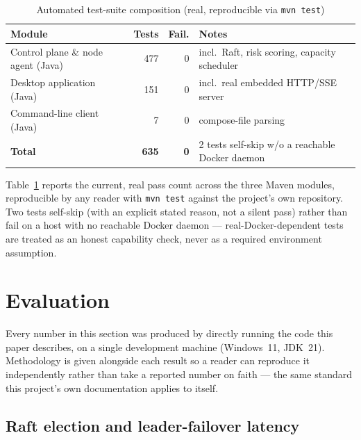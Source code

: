 \documentclass[conference]{IEEEtran}
\begin{document}
\begin{table}[t]
\caption{Automated test-suite composition (real, reproducible via \texttt{mvn test})}
\label{tab:tests}
\centering
\small
\begin{tabularx}{\linewidth}{@{}X r r X@{}}
\toprule
\textbf{Module} & \textbf{Tests} & \textbf{Fail.} & \textbf{Notes} \\
\midrule
Control plane \& node agent (Java) & 477 & 0 & incl.\ Raft, risk scoring, capacity scheduler \\
Desktop application (Java) & 151 & 0 & incl.\ real embedded HTTP/SSE server \\
Command-line client (Java) & 7 & 0 & compose-file parsing \\
\midrule
\textbf{Total} & \textbf{635} & \textbf{0} & 2 tests self-skip w/o a reachable Docker daemon \\
\bottomrule
\end{tabularx}
\end{table}

Table~\ref{tab:tests} reports the current, real pass count across the three Maven modules, reproducible
by any reader with \texttt{mvn test} against the project's own repository. Two tests self-skip (with
an explicit stated reason, not a silent pass) rather than fail on a host with no reachable Docker
daemon — real-Docker-dependent tests are treated as an honest capability check, never as a required
environment assumption.

\section{Evaluation}
\label{sec:eval}

Every number in this section was produced by directly running the code this paper describes, on a
single development machine (Windows~11, JDK~21). Methodology is given alongside each result so a
reader can reproduce it independently rather than take a reported number on faith — the same standard
this project's own documentation applies to itself.

\subsection{Raft election and leader-failover latency}
\end{document}
